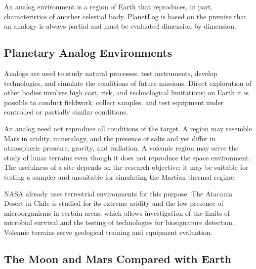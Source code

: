 \documentclass[12pt,letterpaper]{article}
\begin{document}
An analog environment is a region of Earth that reproduces, in part, characteristics of another celestial body. PlanetLog is based on the premise that an analogy is always partial and must be evaluated dimension by dimension.

\subsection{Planetary Analog Environments}

Analogs are used to study natural processes, test instruments, develop technologies, and simulate the conditions of future missions. Direct exploration of other bodies involves high cost, risk, and technological limitations; on Earth it is possible to conduct fieldwork, collect samples, and test equipment under controlled or partially similar conditions.

An analog need not reproduce all conditions of the target. A region may resemble Mars in aridity, mineralogy, and the presence of salts and yet differ in atmospheric pressure, gravity, and radiation. A volcanic region may serve the study of lunar terrains even though it does not reproduce the space environment. The usefulness of a site depends on the research objective: it may be suitable for testing a sampler and unsuitable for simulating the Martian thermal regime.

NASA already uses terrestrial environments for this purpose. The Atacama Desert in Chile is studied for its extreme aridity and the low presence of microorganisms in certain areas, which allows investigation of the limits of microbial survival and the testing of technologies for biosignature detection. Volcanic terrains serve geological training and equipment evaluation.

\subsection{The Moon and Mars Compared with Earth}
\end{document}
